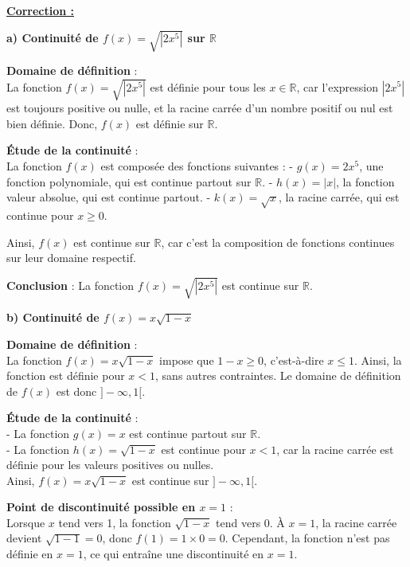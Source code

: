 \documentclass{article}
\newcounter{correction}
\newcommand{\correction}{%
  \refstepcounter{correction}%
  \textbf{\textcolor{myorange}{Correction \thecorrection :}} \ignorespaces
}
\begin{document}
\begin{enumerate}[label=\arabic*)]
		\textbf{\underline{\correction}}
		
\textbf{a) Continuité de \( f(x) = \sqrt{|2x^5|} \) sur \( \mathbb{R} \)}

\textbf{Domaine de définition} : \\
La fonction \( f(x) = \sqrt{|2x^5|} \) est définie pour tous les \( x \in \mathbb{R} \), car l’expression \( |2x^5| \) est toujours positive ou nulle, et la racine carrée d’un nombre positif ou nul est bien définie. Donc, \( f(x) \) est définie sur \( \mathbb{R} \).

\textbf{Étude de la continuité} : \\
La fonction \( f(x) \) est composée des fonctions suivantes :
- \( g(x) = 2x^5 \), une fonction polynomiale, qui est continue partout sur \( \mathbb{R} \).
- \( h(x) = |x| \), la fonction valeur absolue, qui est continue partout.
- \( k(x) = \sqrt{x} \), la racine carrée, qui est continue pour \( x \geq 0 \).

Ainsi, \( f(x) \) est continue sur \( \mathbb{R} \), car c’est la composition de fonctions continues sur leur domaine respectif.

\textbf{Conclusion} : La fonction \( f(x) = \sqrt{|2x^5|} \) est continue sur \( \mathbb{R} \).

\textbf{b) Continuité de \( f(x) = x\sqrt{1 - x} \)}

\textbf{Domaine de définition} : \\
La fonction \( f(x) = x\sqrt{1 - x} \) impose que \( 1 - x \geq 0 \), c'est-à-dire \( x \leq 1 \). Ainsi, la fonction est définie pour \( x < 1 \), sans autres contraintes. Le domaine de définition de \( f(x) \) est donc \( ]-\infty, 1[ \).

\textbf{Étude de la continuité} : \\
- La fonction \( g(x) = x \) est continue partout sur \( \mathbb{R} \). \\
- La fonction \( h(x) = \sqrt{1 - x} \) est continue pour \( x < 1 \), car la racine carrée est définie pour les valeurs positives ou nulles. \\
Ainsi, \( f(x) = x\sqrt{1 - x} \) est continue sur \( ]-\infty, 1[ \).

\textbf{Point de discontinuité possible en \( x = 1 \)} : \\
Lorsque \( x \) tend vers 1, la fonction \( \sqrt{1 - x} \) tend vers 0. À \( x = 1 \), la racine carrée devient \( \sqrt{1 - 1} = 0 \), donc \( f(1) = 1 \times 0 = 0 \). Cependant, la fonction n'est pas définie en \( x = 1 \), ce qui entraîne une discontinuité en \( x = 1 \).


\end{enumerate}
\end{document}
